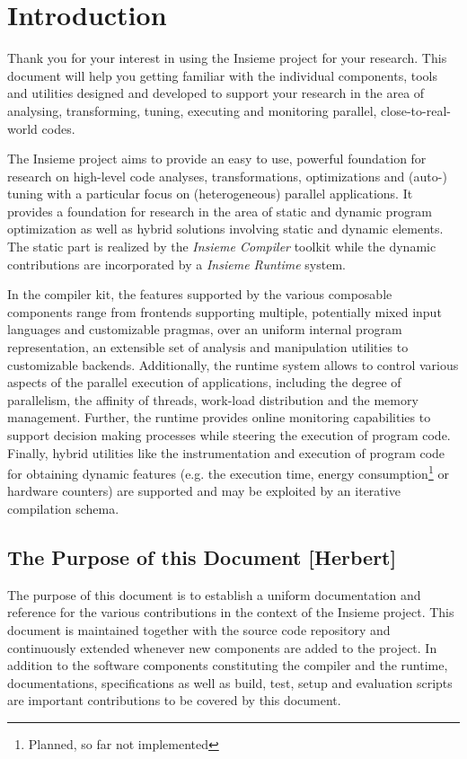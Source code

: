 \chapter{Introduction} \label{cap:introduction}

Thank you for your interest in using the Insieme \cite{insieme} project for your
research. This document will help you getting familiar with the individual
components, tools and utilities designed and developed to support your research
in the area of analysing, transforming, tuning, executing and monitoring
parallel, close-to-real-world codes.


The Insieme project aims to provide an easy to use, powerful foundation for
research on high-level code analyses, transformations, optimizations and (auto-)
tuning with a particular focus on (heterogeneous) parallel applications.
It provides a foundation for research in the area of static and dynamic
program optimization as well as hybrid solutions involving static and
dynamic elements. The static part is realized by the \textit{Insieme Compiler}
toolkit while the dynamic contributions are incorporated by a
\textit{Insieme Runtime} system.   

 
In the compiler kit, the features supported by the various composable components
range from frontends supporting multiple, potentially mixed input languages and
customizable pragmas, over an uniform internal program representation, an
extensible set of analysis and manipulation utilities to customizable backends.
Additionally, the runtime system allows to control various aspects of the
parallel execution of applications, including the degree of parallelism, the
affinity of threads, work-load distribution and the memory management. Further,
the runtime provides online monitoring capabilities to support decision making
processes while steering the execution of program code. Finally, hybrid
utilities like the instrumentation and execution of program code for obtaining
dynamic features (e.g. the execution time, energy consumption\footnote{Planned,
so far not implemented} or hardware counters) are supported and may be
exploited by an iterative compilation schema.

\section{The Purpose of this Document  [Herbert]}
The purpose of this document is to establish a uniform documentation and
reference for the various contributions in the context of the Insieme project.
This document is maintained together with the source code repository and
continuously extended whenever new components are added to the project. In
addition to the software components constituting the compiler and the runtime,
documentations, specifications as well as build, test, setup and evaluation
scripts are important contributions to be covered by this
document.


